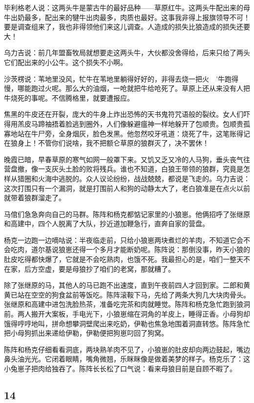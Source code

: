 \par 毕利格老人说：这两头牛是蒙古牛的最好品种——草原红牛。这两头牛配出来的母牛出奶最多，配出来的犍牛出肉最多，肉质也最好。这事我非得上报旗领导不可！要是调查组来了，我也非得领他们来这儿调查。人造成的损失比狼造成的损失还要大！
\par 乌力吉说：前几年盟畜牧局就想要走这两头牛，大伙都没舍得给，后来只给了两头它们配出来的小公牛。这个损失不小啊。
\par 沙茨楞说：苇地里没风，牤牛在苇地里躺得好好的，非得去烧一把火　’牛跑得慢，哪能跑过火呢。那么大的油烟，一呛就把牛给呛死了。草原上还从来没有人把牛烧死的事呢。不信腾格里，就要遭报应。
\par 焦黑的牛皮还在开裂，庞大的牛身上炸出恐怖的天书鬼符咒语般的裂纹。女人们吓得用羔皮马蹄袖捂着脸逃到圈外，人们像躲避瘟神一样地躲开了包顺贵。包顺贵孤寡地站在牛尸旁，全身烟灰，脸色发黑。他忽然咬牙吼道：烧死了牛，这笔账得记在狼身上！不管你们说啥，我不把额仑草原的狼群灭了，决不罢休！
\par 晚霞已暗，早春草原的寒气如网一般罩下来。又饥又乏又冷的人马狗，垂头丧气往营盘撤，像一支灰头土脸的败将残兵。谁也不知道，白狼王带领的狼群，究竟是怎样从猎圈和火海中逃脱的。众人议论纷纷，战战兢兢，都说是飞走的。乌力吉说：这次打围只有一个漏洞，就是打围前人和狗的动静太大了，老白狼准是在点火以前就带着狼群溜走了。
\par 马倌们急急奔向自己的马群。陈阵和杨克都惦记家里的小狼崽。他俩招呼了张继原和高建中，四个人脱离了大队，抄近道加鞭急行，直奔自家的营盘。
\par 杨克一边跑一边嘀咕说：半夜临走前，只给小狼崽两块煮烂的羊肉，不知道它会不会吃肉，道尔基说狼崽还得一个多月才能断奶呢。陈阵说：那倒没事，昨天小狼的肚皮吃得都快爆了，它就是不会吃熟肉，也饿不死。我最担心的是，咱们一整天不在家，后方空虚，要是母狼抄了咱们的老窝，那就糟了。
\par 除了张继原的马，其他人的马已跑不出速度，直到午夜前四人才回到家。二郎和黄黄已站在空空的狗食盆前等饭吃。陈阵滚鞍下马，先给了两条大狗几大块肉骨头。张继原和高建中进包洗脸热茶，准备吃完茶和肉就睡觉。陈阵和杨克急忙跑到狼洞前。两人搬开大案板，手电光下，小狼崽缩在洞角的羊皮上，睡得正香。小母狗却饿得哼哼地叫，拼命想攀洞壁爬出来吃奶，伊勒也焦急地围着洞直转悠。陈阵急忙把小母狗抓出来递给伊勒，伊勒便把狗崽叼回了狗窝。
\par 陈阵和杨克仔细看看洞底，两块熟羊肉不见了，小狼崽的肚皮却向两边鼓起，嘴边鼻头油光光。它闭着眼睛，嘴角微翘，乐眯眯像是做着美梦的样子。杨克乐了：这小兔崽子把肉给独吞了。陈阵长长松了口气说：看来母狼目前是自顾不暇了。


\subsection*{14}


